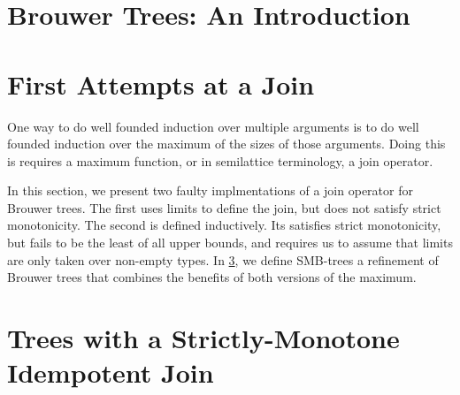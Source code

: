 



\section{Brouwer Trees: An Introduction}




\section{First Attempts at a Join}
\label{sec:join}
One way to do well founded induction over multiple arguments is to do well founded
induction over the maximum of the sizes of those arguments. Doing this is requires
a maximum function, or in semilattice terminology, a join operator.

In this section, we present two faulty implmentations of a join operator
for Brouwer trees. The first uses limits to define the join, but does not satisfy
strict monotonicity. The second is defined inductively. Its satisfies
strict monotonicity, but fails to be the least of all upper bounds,
and requires us to assume that limits are only taken over non-empty types.
In \cref{sec:strict}, we define SMB-trees a refinement of Brouwer trees that combines
the benefits of both versions of the maximum.
  
  

  \section{Trees with a Strictly-Monotone Idempotent Join}
  \label{sec:strict}










